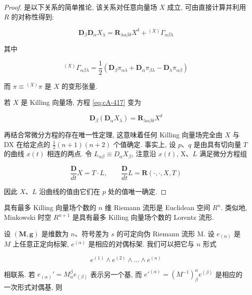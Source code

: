 \begin{proof}
\hyperref[prop:cA-3.4]{} 是以下关系的简单推论, 该关系对任意向量场 $X$ 成立, 可由直接计算并利用 $R$ 的对称性得到:

\begin{equation}
\mathbf{D}_{\beta}\mathbf{D}_{\alpha}X_{\lambda} = \mathbf{R}_{\lambda\alpha\beta\delta}X^{\delta} + {}^{(X)}\Gamma_{\alpha\beta\lambda}\label{eq:cA-417}
\end{equation}

其中

\begin{equation}
{}^{(X)}\Gamma_{\alpha\beta\lambda} = \frac{1}{2}\left(\mathbf{D}_{\beta}\pi_{\alpha\lambda} + \mathbf{D}_{\alpha}\pi_{\beta\lambda} - \mathbf{D}_{\lambda}\pi_{\alpha\beta}\right)\label{eq:cA-418}
\end{equation}

而 $\pi \equiv {}^{(X)}\pi$ 是 $X$ 的变形张量.

若 $X$ 是 Killing 向量场, 方程 \eqref{eq:cA-417} 变为

\begin{equation}
\mathbf{D}_{\beta}(\mathbf{D}_{\alpha}X_{\lambda}) = \mathbf{R}_{\lambda\alpha\beta\delta}X^{\delta}\label{eq:cA-419}
\end{equation}

再结合常微分方程的存在唯一性定理, 这意味着任何 Killing 向量场完全由 $X$ 与 DX 在给定点的 $\frac{1}{2}(n+1)(n+2)$ 个值确定. 事实上, 设 $p$、$q$ 是由具有切向量 $T$ 的曲线 $x(t)$ 相连的两点. 令 $L_{\alpha\beta} \equiv D_{\alpha}X_{\beta}$, 注意沿 $x(t)$, X、$L$ 满足微分方程组

\[
\frac{\mathbf{D}}{dt}X = T \cdot L, \qquad \frac{\mathbf{D}}{dt}L = \mathbf{R}(\cdot, \cdot, X, T)
\]

因此 $X$、$L$ 沿曲线的值由它们在 $p$ 处的值唯一确定.
\end{proof}

具有最多 Killing 向量场个数的 $n$ 维 Riemann 流形是 Euclidean 空间 $R^{n}$. 类似地, Minkowski 时空 $R^{n+1}$ 是具有最多 Killing 向量场个数的 Lorentz 流形.


设 $(\mathbf{M}, \mathbf{g})$ 是维数为 $n$、符号差为 $s$ 的可定向伪 Riemann 流形 M. 设 $e_{(\alpha)}$ 是 $M$ 上任意正定向标架, $e^{(\alpha)}$ 是相应的对偶标架. 我们可以把它与 $n$ 形式

\[
e^{(1)} \wedge e^{(2)} \wedge \ldots \wedge e^{(n)}
\]

相联系. 若 $e_{(\alpha)}' = M_{\alpha}^{\beta}e_{(\beta)}$ 表示另一个基, 而 $e'^{(\alpha)} = (M^{-1})_{\beta}^{\alpha}e^{(\beta)}$ 是相应的一次形式对偶基, 则

